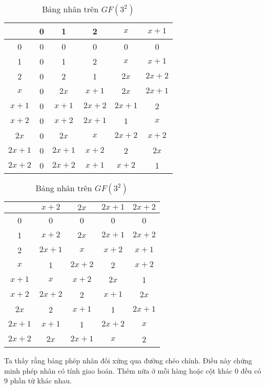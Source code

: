 \begin{table}
    \centering
    \begin{subtable}[h]{\textwidth}
        \centering
        \begin{tabular}{|c|c|c|c|c|c|}
            \hline
            & 0 & 1 & 2 & $x$ & $x+1$ \\
            \hline
            0 & 0 & 0 & 0 & 0 & 0 \\
            \hline
            1 & 0 & 1 & 2 & $x$ & $x+1$ \\
            \hline
            2 & 0 & 2 & 1 & $2x$ & $2x+2$\\
            \hline
            $x$ & 0 & $2x$ & $x+1$ & $2x$ & $2x+1$ \\
            \hline
            $x+1$ & 0 & $x+1$ & $2x+2$ & $2x+1$ & 2\\
            \hline
            $x+2$ & 0 & $x+2$ & $2x+1$ & 1 & $x$ \\
            \hline
            $2x$ & 0 & $2x$ & $x$ & $2x+2$ & $x+2$ \\
            \hline
            $2x+1$ & 0 & $2x+1$ & $x+2$ & 2 & $2x$ \\
            \hline
            $2x+2$ & 0 & $2x+2$ & $x+1$ & $x+2$ & 1 \\
            \hline
        \end{tabular}
        \caption{Nửa đầu bảng nhân}
    \end{subtable}
    
    \begin{subtable}[h]{\textwidth}
        \centering
        \begin{tabular}{|c|c|c|c|c|}
            \hline
            & $x+2$ & $2x$ & $2x+1$ & $2x+2$ \\
            \hline
            0 & 0 & 0 & 0 & 0 \\
            \hline
            1 & $x+2$ & $2x$ & $2x+1$ & $2x+2$ \\
            \hline
            2 & $2x+1$ & $x$ & $x+2$ & $x+1$ \\
            \hline
            $x$ & 1 & $2x+2$ & 2 & $x+2$ \\
            \hline
            $x+1$ & $x$ & $x+2$ & $2x$ & 1 \\
            \hline
            $x+2$ & $2x+2$ & 2 & $x+1$ & $2x$ \\
            \hline
            $2x$ & 2 & $x+1$ & 1 & $2x+1$ \\
            \hline
            $2x+1$ & $x+1$ & 1 & $2x+2$ & $x$ \\
            \hline
            $2x+2$ & $2x$ & $2x+1$ & $x$ & 2 \\
            \hline
        \end{tabular}
        \caption{Nửa sau bảng nhân}
    \end{subtable}
    \caption{Bảng nhân trên $GF(3^2)$}
\end{table}

Ta thấy rằng bảng phép nhân đối xứng qua đường chéo chính. 
Điều này chứng minh phép nhân có tính giao hoán. 
Thêm nữa ở mỗi hàng hoặc cột khác 0 đều có 9 phần tử 
khác nhau.

